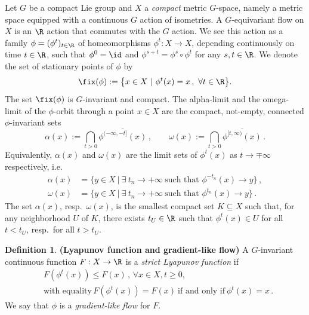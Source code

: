 \documentclass[11pt,a4paper,reqno]{article}
\numberwithin{equation}{section}
\theoremstyle{definition}
\newtheorem{definition}[theorem]{Definition}
\begin{document}
Let $G$ be a compact Lie group and $X$ a {\it compact} metric $G$-space, namely a  metric space equipped with a continuous $G$ action of isometries.
A $G$-equivariant flow on $X$ is an $\R$ action that commutes with the $G$ action. We see this action as a family $\phi=(\phi^t)_{t\in\R}$ of homeomorphisms  $\phi^t:X\to X$, depending continuously on time  $t\in\R$, such that $\phi^0=\id$ and $\phi^{s+t}=\phi^s\circ\phi^t$ for any $s,t\in\R$. We denote the set of stationary points of $\phi$ by
\begin{equation*}
\fix(\phi)
:=
\big\{
x\in X\ |\ \phi^t(x)=x \, ,\ \forall t\in\R
\big\}.
\end{equation*}
The set $\fix(\phi)$ is $G$-invariant and compact. The alpha-limit and the omega-limit of the $\phi$-orbit through a point $x\in X$ are the compact, not-empty, connected $\phi$-invariant sets 
\begin{equation*}%
\alpha(x) :=\bigcap_{t>0}\overline{\phi^{(-\infty,-t]}(x)} \, ,
\qquad
\omega(x) := 
\bigcap_{t>0}\overline{\phi^{[t,\infty)}(x)}\, .
\end{equation*}
Equivalently, $\alpha(x)$ and $\omega(x)$ are the limit sets of $\phi^t(x)$ as $t\to
\mp \infty$ respectively, i.e.
\begin{align*}
\alpha (x) 
&= 
\big\{ y \in X \ | \
\exists\ t_n 
\to + \infty \ \mbox{such that }
\phi^{-t_n}(x) \to y \big\} \, ,\\
\omega (x) 
&= 
\big\{ y \in X \ | \
\exists\ t_n 
\to + \infty \ \mbox{such that }
\phi^{t_n}(x) \to y \big\} \, .
\end{align*}
The set  $\alpha(x)$, resp.\  $ \omega(x)$, is the smallest compact set $K\subseteq X$ such that, for any neighborhood 
$U$ of $K$, there exists $ t_U\in\R$ such that $\phi^t (x) \in U$ for all $t<t_U $, resp.\ for all $ t>t_U $.

\begin{definition}
{\bf (Lyapunov function and gradient-like flow)}
A $G$-invariant continuous function 
$F:X\to\R$ 
is a \emph{strict Lyapunov function} if 
\begin{equation}\label{Fphi}
\begin{aligned}
&F(\phi^t(x))\leq F(x) \, , \, \forall 
x\in X, 
t\geq 0,  \,  \\
&\text{with equality}  \,  F(\phi^t(x))=F(x) \ \text{if and only if} \ \phi^t(x)=x \, .
\end{aligned}
\end{equation} 
We say that $\phi$ is a \emph{gradient-like flow} for $F$.
\end{definition}
\end{document}
